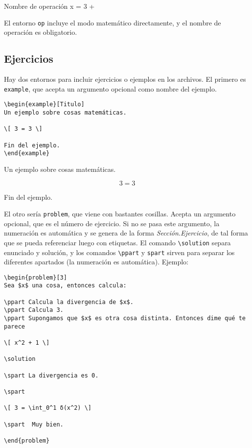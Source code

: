 \documentclass[nochap]{apuntes}
\begin{document}
\begin{op}{Nombre de operación}
x = 3 + 
\end{op}

El entorno \texttt{op} incluye el modo matemático directamente, y el nombre de operación es obligatorio.

\subsection{Ejercicios}

Hay dos entornos para incluir ejercicios o ejemplos en los archivos. El primero es \texttt{example}, que acepta un argumento opcional como nombre del ejemplo.

\begin{verbatim}
\begin{example}[Titulo]
Un ejemplo sobre cosas matemáticas.

\[ 3 = 3 \]

Fin del ejemplo.
\end{example}
\end{verbatim}


\begin{example}[Titulo]
Un ejemplo sobre cosas matemáticas.

\[ 3 = 3 \]

Fin del ejemplo.
\end{example}

El otro sería \texttt{problem}, que viene con bastantes cosillas. Acepta un argumento opcional, que es el número de ejercicio. Si no se pasa este argumento, la numeración es automática y se genera de la forma \textit{Sección.Ejercicio}, de tal forma que se pueda referenciar luego con etiquetas. El comando \verb|\solution| separa enunciado y solución, y los comandos \verb|\ppart| y \verb|spart| sirven para separar los diferentes apartados (la numeración es automática). Ejemplo:

\begin{verbatim}
\begin{problem}[3]
Sea $x$ una cosa, entonces calcula:

\ppart Calcula la divergencia de $x$.
\ppart Calcula 3.
\ppart Supongamos que $x$ es otra cosa distinta. Entonces dime qué te parece

\[ x^2 + 1 \]

\solution

\spart La divergencia es 0.

\spart

\[ 3 = \int_0^1 δ(x^2) \]

\spart  Muy bien.

\end{problem}
\end{verbatim}
\end{document}
